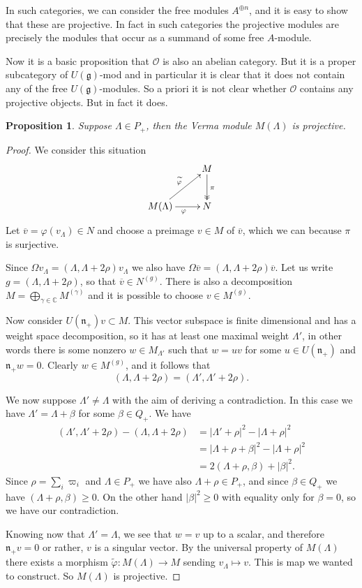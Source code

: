 \documentclass[12pt]{article}
\theoremstyle{plain}
\newtheorem{prop}[thm]{Proposition}
\theoremstyle{definition}
\numberwithin{equation}{section}
\newcommand{\wtil}[1]{\widetilde{#1}}
\newcommand{\ov}[1]{\overline#1}
\newcommand{\La}{\Lambda}
\newcommand{\Om}{\Omega}
\newcommand{\C}{\mathbb{C}}
\newcommand{\g}{\mathfrak{g}}
\newcommand{\n}{\mathfrak{n}}
\newcommand{\OO}{\mathcal{O}}
\begin{document}
In such categories, we can consider the free modules $A^{\oplus n}$, and it is easy to show that these are projective. In fact in such categories the projective modules are precisely the modules that occur as a summand of some free $A$-module.

Now it is a basic proposition that $\OO$ is also an abelian category. But it is a proper subcategory of $U(\g)$-mod and in particular it is clear that it does not contain any of the free $U(\g)$-modules. So a priori it is not clear whether $\OO$ contains any projective objects. But in fact it does.
\begin{prop}
Suppose $\La \in P_+$, then the Verma module $M(\La)$ is projective.
\end{prop}

\begin{proof}
We consider this situation
\begin{align*}
\xymatrix{
 & M \ar@{->>}[d]^{\pi} \\
%
M(\La) \ar@{->}[r]_{\varphi} \ar@{->}[ur]^{\wtil{\varphi}} & N \\
}
\end{align*}
Let $\ov v = \varphi(v_\La) \in N$ and choose a preimage $v \in M$ of $\ov v$, which we can because $\pi$ is surjective.

Since $\Om v_\La = (\La, \La+2\rho) v_\La$ we also have $\Om \ov v = (\La, \La+2\rho) \ov v$. Let us write $g = (\La, \La+2\rho)$, so that $\ov v \in N^{(g)}$. There is also a decomposition $M = \bigoplus_{\gamma \in \C} M^{(\gamma)}$ and it is possible to choose $v \in M^{(g)}$.

Now consider $U(\n_+)v \subset M$. This vector subspace is finite dimensional and has a weight space decomposition, so it has at least one maximal weight $\La'$, in other words there is some nonzero $w \in M_{\La'}$ such that $w = uv$ for some $u \in U(\n_+)$ and $\n_+ w = 0$. Clearly $w \in M^{(g)}$, and it follows that
\[
(\La, \La+2\rho) = (\La', \La'+2\rho).
\]

We now suppose $\La' \neq \La$ with the aim of deriving a contradiction. In this case we have $\La' = \La + \beta$ for some $\beta \in Q_+$. We have
\begin{align*}
(\La', \La'+2\rho) - (\La, \La+2\rho) &= |\La'+\rho|^2 - |\La+\rho|^2 \\
%
&= |\La+\rho+\beta|^2 - |\La+\rho|^2 \\
%
&= 2(\La+\rho, \beta) + |\beta|^2.
\end{align*}
Since $\rho = \sum_i \varpi_i$ and $\La \in P_+$ we have also $\La+\rho \in P_+$, and since $\beta \in Q_+$ we have $(\La+\rho, \beta) \geq 0$. On the other hand $|\beta|^2 \geq 0$ with equality only for $\beta = 0$, so we have our contradiction.

Knowing now that $\La' = \La$, we see that $w=v$ up to a scalar, and therefore $\n_+v = 0$ or rather, $v$ is a singular vector. By the universal property of $M(\La)$ there exists a morphism $\wtil{\varphi} : M(\La) \rightarrow M$ sending $v_\La \mapsto v$. This is map we wanted to construct. So $M(\La)$ is projective.
\end{proof}
\end{document}
